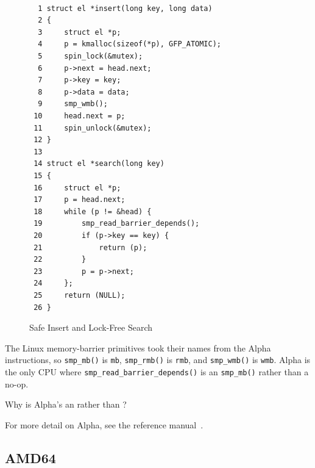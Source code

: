 \begin{figure}
{\tt \scriptsize
\begin{verbatim}
  1 struct el *insert(long key, long data)
  2 {
  3     struct el *p;
  4     p = kmalloc(sizeof(*p), GFP_ATOMIC);
  5     spin_lock(&mutex);
  6     p->next = head.next;
  7     p->key = key;
  8     p->data = data;
  9     smp_wmb();
 10     head.next = p;
 11     spin_unlock(&mutex);
 12 }
 13
 14 struct el *search(long key)
 15 {
 16     struct el *p;
 17     p = head.next;
 18     while (p != &head) {
 19         smp_read_barrier_depends();
 20         if (p->key == key) {
 21             return (p);
 22         }
 23         p = p->next;
 24     };
 25     return (NULL);
 26 }
\end{verbatim}
}
\caption{Safe Insert and Lock-Free Search}
\label{fig:app:whymb:Safe Insert and Lock-Free Search}
\end{figure}

The Linux memory-barrier primitives took their names from the Alpha
instructions, so {\tt smp\_mb()} is {\tt mb}, {\tt smp\_rmb()} is {\tt rmb},
and {\tt smp\_wmb()} is {\tt wmb}.
Alpha is the only CPU where {\tt smp\_read\_barrier\_depends()} is
an {\tt smp\_mb()} rather than a no-op.

\QuickQuiz{}
	Why is Alpha's  an
	 rather than ?
 \QuickQuizEnd

For more detail on Alpha, see the reference manual~\cite{ALPHA95}.

\subsection{AMD64}

